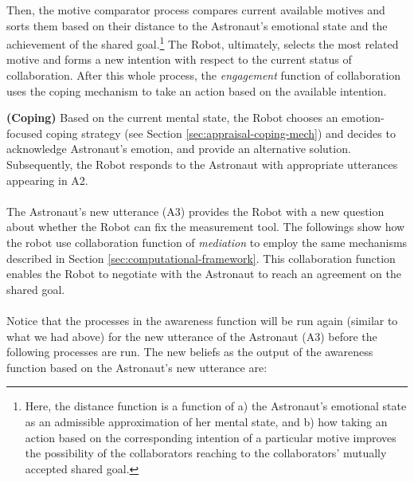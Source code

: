 Then, the motive comparator process compares current available motives and
sorts them based on their distance to the Astronaut's emotional state and
the achievement of the shared goal.\footnote{Here, the distance function is a
function of a) the Astronaut's emotional state as an admissible approximation
of her mental state, and b) how taking an action based on the corresponding
intention of a particular motive improves the possibility of the collaborators
reaching to the collaborators' mutually accepted shared goal.} The Robot,
ultimately, selects the most related motive and forms a new intention with
respect to the current status of collaboration. After this whole process, the
\textit{engagement} function of collaboration uses the coping mechanism to take
an action based on the available intention.\\

\noindent\item \textbf{(Coping)} Based on the current mental state, the Robot
chooses an emotion-focused coping strategy (see Section
\ref{sec:appraisal-coping-mech}) and decides to acknowledge Astronaut's emotion,
and provide an alternative solution. Subsequently, the Robot responds to the
Astronaut with appropriate utterances appearing in A2.\\

\noindent {}\\

The Astronaut's new utterance (A3) provides the Robot with a new question about
whether the Robot can fix the measurement tool. The followings show how the
robot use collaboration function of \textit{mediation} to employ the same
mechanisms described in Section \ref{sec:computational-framework}. This
collaboration function enables the Robot to negotiate with the Astronaut to
reach an agreement on the shared goal.\\

\noindent{}\\

Notice that the processes in the awareness function will be run again (similar
to what we had above) for the new utterance of the Astronaut (A3) before the
following processes are run. The new beliefs as the output of the awareness
function based on the Astronaut's new utterance are:


